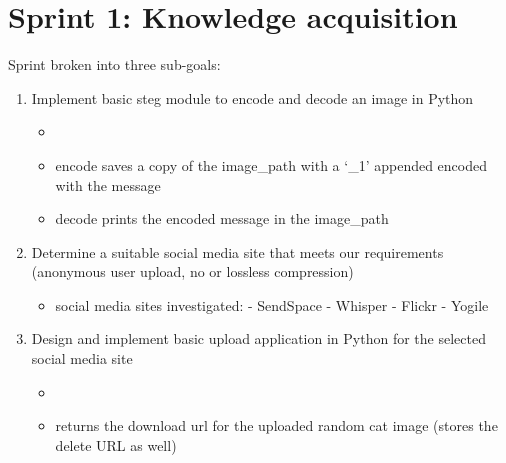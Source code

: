 \documentclass[letterpaper,12pt,openany,oneside]{sphinxmanual}
\begin{document}
\section{Sprint 1: Knowledge acquisition}
\label{index:sprint-1-knowledge-acquisition}
Sprint broken into three sub-goals:
\begin{enumerate}
\item {} 
Implement basic steg module to encode and decode an image in Python
\begin{itemize}
\item {} 

\item {} 
encode saves a copy of the image\_path with a `\_1' appended encoded with the message

\item {} 
decode prints the encoded message in the image\_path

\end{itemize}

\item {} 
Determine a suitable social media site that meets our requirements (anonymous user upload, no or lossless compression)
\begin{itemize}
\item {} 
social media sites investigated:
- SendSpace
- Whisper
- Flickr
- Yogile

\end{itemize}

\item {} 
Design and implement basic upload application in Python for the selected social media site
\begin{itemize}
\item {} 

\item {} 
returns the download url for the uploaded random cat image (stores the delete URL as well)

\end{itemize}

\end{enumerate}
\end{document}
